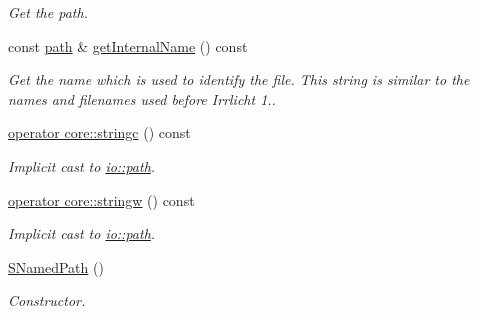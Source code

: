 \begin{DoxyCompactItemize}
\begin{DoxyCompactList}\small\item\em Get the path. \end{DoxyCompactList}\item 
\mbox{\label{structirr_1_1io_1_1SNamedPath_aca15cc5d5d79fc11927331c1c2108cb2}} 
const \hyperlink{namespaceirr_1_1io_a6468281622ce3a1c46b72e19f32dded5}{path} \& \hyperlink{structirr_1_1io_1_1SNamedPath_aca15cc5d5d79fc11927331c1c2108cb2}{get\+Internal\+Name} () const
\begin{DoxyCompactList}\small\item\em Get the name which is used to identify the file. This string is similar to the names and filenames used before Irrlicht 1.. \end{DoxyCompactList}\item 
\mbox{\label{structirr_1_1io_1_1SNamedPath_a414604db7696d60f759e645beee928c8}} 
\hyperlink{structirr_1_1io_1_1SNamedPath_a414604db7696d60f759e645beee928c8}{operator core\+::stringc} () const
\begin{DoxyCompactList}\small\item\em Implicit cast to \hyperlink{namespaceirr_1_1io_a6468281622ce3a1c46b72e19f32dded5}{io\+::path}. \end{DoxyCompactList}\item 
\mbox{\label{structirr_1_1io_1_1SNamedPath_abe0d6bc5cf1c59bc90ea9d98750a8976}} 
\hyperlink{structirr_1_1io_1_1SNamedPath_abe0d6bc5cf1c59bc90ea9d98750a8976}{operator core\+::stringw} () const
\begin{DoxyCompactList}\small\item\em Implicit cast to \hyperlink{namespaceirr_1_1io_a6468281622ce3a1c46b72e19f32dded5}{io\+::path}. \end{DoxyCompactList}\item 
\mbox{\label{structirr_1_1io_1_1SNamedPath_a6a4926fa6d0889cc0da49cb3e74415a4}} 
\hyperlink{structirr_1_1io_1_1SNamedPath_a6a4926fa6d0889cc0da49cb3e74415a4}{S\+Named\+Path} ()
\begin{DoxyCompactList}\small\item\em Constructor. \end{DoxyCompactList}\item 

\end{DoxyCompactItemize}
